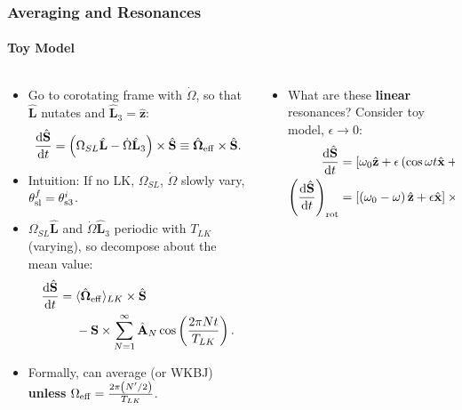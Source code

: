 \documentclass[dvipsnames, 8pt]{beamer}
\newcommand*{\rd}[2]{\frac{\mathrm{d}#1}{\mathrm{d}#2}}
\newcommand*{\bm}[1]{\boldsymbol{\mathbf{#1}}}
\newcommand*{\uv}[1]{\hat{\bm{#1}}}
\newcommand*{\ev}[1]{\langle#1\rangle}
\newcommand*{\p}[1]{\left(#1\right)}
\newcommand*{\s}[1]{\left[#1\right]}
\begin{document}
\begin{frame}
    \frametitle{Averaging and Resonances}
    \framesubtitle{Toy Model}

    \begin{columns}
        \begin{column}{0.5\textwidth}
            \begin{itemize}
                \item Go to corotating frame with $\dot{\Omega}$, so that
                    $\uv{L}$ nutates and $\uv{L}_3 = \uv{z}$:
                    \begin{equation}
                        \rd{\uv{S}}{t} = \p{\Omega_{SL} \uv{L}
                            - \dot{\Omega} \uv{L}_3} \times \uv{S}
                            \equiv \uv{\Omega}_{\rm eff} \times \uv{S}.
                    \end{equation}

                \item Intuition: If no LK, $\Omega_{SL}$, $\dot{\Omega}$ slowly
                    vary, $\theta_{\rm sl}^f = \theta_{\rm s3}^i$.

                \item $\Omega_{SL}\uv{L}$ and $\dot{\Omega}\uv{L}_3$ periodic
                    with $T_{LK}$ (varying), so decompose about the mean value:
                    \begin{align}
                        \rd{\uv{S}}{t} ={}&
                            \ev{\uv{\Omega}_{\rm eff}}_{LK}
                                \times \uv{S}\nonumber\\
                            &- \bm{S} \times \sum\limits_{N = 1}^\infty \uv{A}_N
                                \cos \p{\frac{2\pi N t}{T_{LK}}}.
                    \end{align}

                \item Formally, can average (or WKBJ) \textbf{unless}
                    $\Omega_{\rm eff} = \frac{2\pi \p{N' / 2}}{T_{LK}}$.
            \end{itemize}
        \end{column}
        \begin{column}{0.5\textwidth}
            \begin{itemize}
                \item What are these \textbf{linear} resonances? Consider toy
                    model, $\epsilon \to 0$:
                    \begin{align}
                        \rd{\uv{S}}{t} &= \s{\omega_0 \uv{z}
                            + \epsilon\p{\cos \omega t \uv{x} + \sin
                            \omega t \uv{y}}} \times \uv{S},\\
                        \p{\rd{\uv{S}}{t}}_{\rm rot} &=
                            \s{\p{\omega_0 - \omega}\uv{z} + \epsilon
                                \uv{x}} \times \uv{S}.
                    \end{align}


\end{itemize}
\end{column}
\end{columns}
\end{frame}
\end{document}
